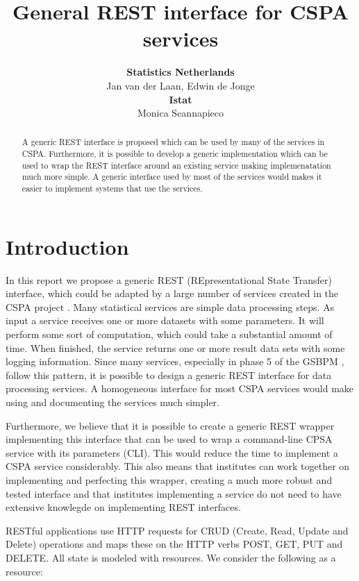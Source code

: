 \documentclass[a4paper]{article}
\title{General REST interface for CSPA services}
\author{\textbf{Statistics Netherlands}\\ 
Jan van der Laan, Edwin de Jonge\\[1ex]
\textbf{Istat}\\
Monica Scannapieco}
\begin{document}
\maketitle

\begin{abstract}
A generic REST interface is proposed which can be used by many of the services
in CSPA. Furthermore, it is possible to develop a generic implementation which
can be used to wrap the REST interface around an existing service making
implemenatation much more simple. A generic interface used by most of the
services would makes it easier to implement systems that use the services.
\end{abstract}

\section{Introduction}

In this report we propose a generic REST (REpresentational State Transfer)
interface, which could be adapted by a large number of services created in the
CSPA project \citep{cspa2013}. Many statistical services are simple data
processing steps. As input a service receives one or more datasets with some
parameters. It will perform some sort of computation, which could take a
substantial amount of time.  When finished, the service returns one or more
result data sets with some logging information.  Since many services, especially
in phase 5 of the GSBPM \citep{gsbpm2013}, follow this
pattern, it is possible to design a generic REST interface for data processing
services.  A homogeneous interface for most CSPA services would make using and
documenting the services much simpler. 

Furthermore, we believe that it is possible to create a generic REST wrapper
implementing this interface that can be used to wrap a command-line CPSA service
with its parameters (CLI). This would reduce the time to implement a CSPA
service considerably.  This also means that institutes can work together on
implementing and perfecting this wrapper, creating a much more robust and tested
interface and that institutes implementing a service do not need to have
extensive knowlegde on implementing REST interfaces. 

RESTful applications use HTTP requests for CRUD (Create, Read, Update and
Delete) operations and maps these on the HTTP verbs POST, GET, PUT and DELETE.
All state is modeled with resources. We consider the following as a resource:
\end{document}
